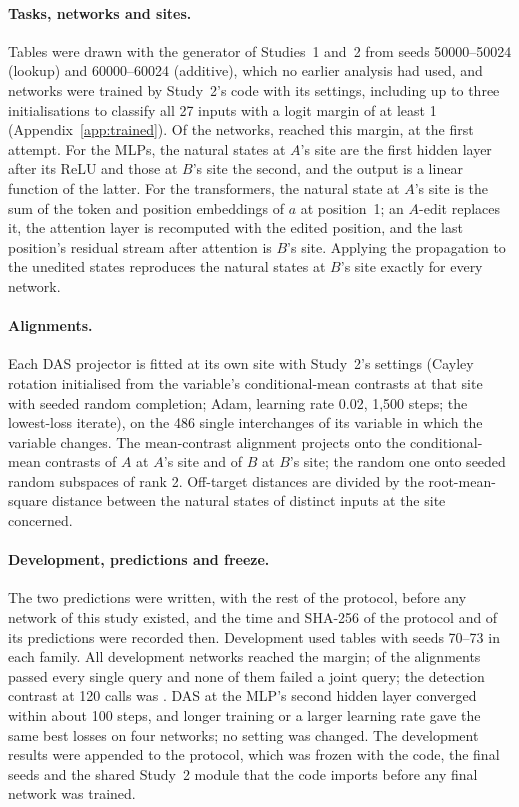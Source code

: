 \paragraph{Tasks, networks and sites.}
Tables were drawn with the generator of Studies~1 and~2 from seeds 50000--50024 (lookup) and 60000--60024 (additive),
which no earlier analysis had used, and networks were trained by Study~2's code with its settings, including up to
three initialisations to classify all 27 inputs with a logit margin of at least 1 (Appendix~\ref{app:trained}).
Of the \MsNetworks{} networks, \MsCompetent{} reached this margin, \MsFirstAttempt{} at the first attempt. For the MLPs, the natural states at $A$'s site are the first hidden layer after its ReLU and those at $B$'s
site the second, and the output is a linear function of the latter. For the transformers, the natural state at $A$'s
site is the sum of the token and position embeddings of $a$ at position~1; an $A$-edit replaces it, the attention
layer is recomputed with the edited position, and the last position's residual stream after attention is $B$'s site.
Applying the propagation to the unedited states reproduces the natural states at $B$'s site exactly for every network.

\paragraph{Alignments.}
Each DAS projector is fitted at its own site with Study~2's settings (Cayley rotation initialised from the variable's
conditional-mean contrasts at that site with seeded random completion; Adam, learning rate 0.02, 1,500 steps; the
lowest-loss iterate), on the 486 single interchanges of its variable in which the variable changes. The mean-contrast
alignment projects onto the conditional-mean contrasts of $A$ at $A$'s site and of $B$ at $B$'s site; the random one
onto seeded random subspaces of rank 2. Off-target distances are divided by the root-mean-square distance between the
natural states of distinct inputs at the site concerned.

\paragraph{Development, predictions and freeze.}
The two predictions were written, with the rest of the protocol, before any network of this study existed, and the
time and SHA-256 of the protocol and of its predictions were recorded then. Development used tables with seeds 70--73
in each family. All \MsDevNetworks{} development networks reached the margin; \MsDevPerfect{} of the \MsDevAlignments{} alignments passed every single
query and none of them failed a joint query; the detection contrast at 120 calls was \MsDevContrast. DAS at the MLP's
second hidden layer converged within about 100 steps, and longer training or a larger learning rate gave the same best
losses on four networks; no setting was changed. The development results were appended to the protocol, which was
frozen with the code, the final seeds and the shared Study~2 module that the code imports before any final network was trained.

